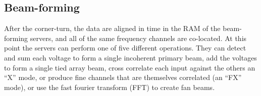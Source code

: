 \subsection{Beam-forming}

After the corner-turn, the data are aligned in time in the RAM of the beam-forming servers, and all of the same frequency channels are co-located. At this point the servers can perform one of five different operations. They can detect and sum each voltage to form a single incoherent primary beam, add the voltages to form a single tied array beam, cross correlate each input against the others an ``X'' mode, or produce fine channels that are themselves correlated (an ``FX'' mode), or use the fast fourier transform (FFT) to create fan beams. 